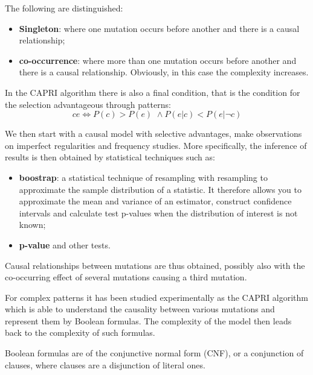 The following are distinguished:
\begin{itemize}
    \item \textbf{Singleton}: where one mutation occurs before another and there is a causal relationship;
    \item \textbf{co-occurrence}: where more than one mutation occurs before another and there is a 
        causal relationship. Obviously, in this case the complexity increases.
\end{itemize}

In the CAPRI algorithm there is also a final condition, that is the condition for the selection
advantageous through patterns:
\begin{equation*}
    c e \Longleftrightarrow P(c) > P(e) \,\, \land P(e | c) < P(e| \lnot c)
\end{equation*}

We then start with a causal model with selective advantages, make observations on imperfect regularities
and frequency studies. More specifically, the inference of results is then obtained by statistical
techniques such as:
\begin{itemize}
    \item \textbf{boostrap}: a statistical technique of resampling with resampling to approximate the
        sample distribution of a statistic. It therefore allows you to approximate the mean and variance
        of an estimator, construct confidence intervals and calculate test p-values when the distribution
        of interest is not known;
    \item \textbf{p-value} and other tests.
\end{itemize}

Causal relationships between mutations are thus obtained, possibly also with the co-occurring effect 
of several mutations causing a third mutation.

For complex patterns it has been studied experimentally as the CAPRI algorithm which is able to understand
the causality between various mutations and represent them by Boolean formulas. The complexity of the 
model then leads back to the complexity of such formulas.

Boolean formulas are of the conjunctive normal form (CNF), or a conjunction of clauses, where clauses are
a disjunction of literal ones.

